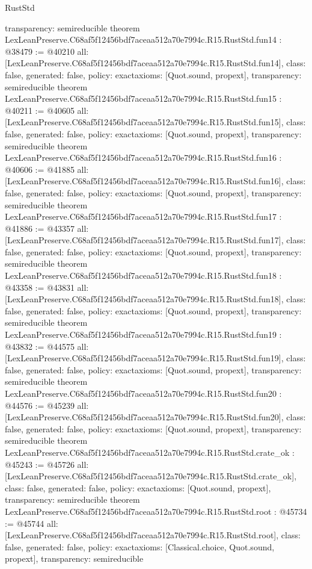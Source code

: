 \begin{lexlean}{RustStd}
\begin{coremodule}
{  transparency: semireducible
}
theorem LexLeanPreserve.C68af5f12456bdf7aceaa512a70e7994c.R15.RustStd.fun14 : @38479 := @40210 {
  all: [LexLeanPreserve.C68af5f12456bdf7aceaa512a70e7994c.R15.RustStd.fun14],
  class: false,
  generated: false,
  policy: exact{axioms: [Quot.sound, propext]},
  transparency: semireducible
}
theorem LexLeanPreserve.C68af5f12456bdf7aceaa512a70e7994c.R15.RustStd.fun15 : @40211 := @40605 {
  all: [LexLeanPreserve.C68af5f12456bdf7aceaa512a70e7994c.R15.RustStd.fun15],
  class: false,
  generated: false,
  policy: exact{axioms: [Quot.sound, propext]},
  transparency: semireducible
}
theorem LexLeanPreserve.C68af5f12456bdf7aceaa512a70e7994c.R15.RustStd.fun16 : @40606 := @41885 {
  all: [LexLeanPreserve.C68af5f12456bdf7aceaa512a70e7994c.R15.RustStd.fun16],
  class: false,
  generated: false,
  policy: exact{axioms: [Quot.sound, propext]},
  transparency: semireducible
}
theorem LexLeanPreserve.C68af5f12456bdf7aceaa512a70e7994c.R15.RustStd.fun17 : @41886 := @43357 {
  all: [LexLeanPreserve.C68af5f12456bdf7aceaa512a70e7994c.R15.RustStd.fun17],
  class: false,
  generated: false,
  policy: exact{axioms: [Quot.sound, propext]},
  transparency: semireducible
}
theorem LexLeanPreserve.C68af5f12456bdf7aceaa512a70e7994c.R15.RustStd.fun18 : @43358 := @43831 {
  all: [LexLeanPreserve.C68af5f12456bdf7aceaa512a70e7994c.R15.RustStd.fun18],
  class: false,
  generated: false,
  policy: exact{axioms: [Quot.sound, propext]},
  transparency: semireducible
}
theorem LexLeanPreserve.C68af5f12456bdf7aceaa512a70e7994c.R15.RustStd.fun19 : @43832 := @44575 {
  all: [LexLeanPreserve.C68af5f12456bdf7aceaa512a70e7994c.R15.RustStd.fun19],
  class: false,
  generated: false,
  policy: exact{axioms: [Quot.sound, propext]},
  transparency: semireducible
}
theorem LexLeanPreserve.C68af5f12456bdf7aceaa512a70e7994c.R15.RustStd.fun20 : @44576 := @45239 {
  all: [LexLeanPreserve.C68af5f12456bdf7aceaa512a70e7994c.R15.RustStd.fun20],
  class: false,
  generated: false,
  policy: exact{axioms: [Quot.sound, propext]},
  transparency: semireducible
}
theorem LexLeanPreserve.C68af5f12456bdf7aceaa512a70e7994c.R15.RustStd.crate_ok : @45243 := @45726 {
  all: [LexLeanPreserve.C68af5f12456bdf7aceaa512a70e7994c.R15.RustStd.crate_ok],
  class: false,
  generated: false,
  policy: exact{axioms: [Quot.sound, propext]},
  transparency: semireducible
}
theorem LexLeanPreserve.C68af5f12456bdf7aceaa512a70e7994c.R15.RustStd.root : @45734 := @45744 {
  all: [LexLeanPreserve.C68af5f12456bdf7aceaa512a70e7994c.R15.RustStd.root],
  class: false,
  generated: false,
  policy: exact{axioms: [Classical.choice, Quot.sound, propext]},
  transparency: semireducible
}


\end{coremodule}
\end{lexlean}
